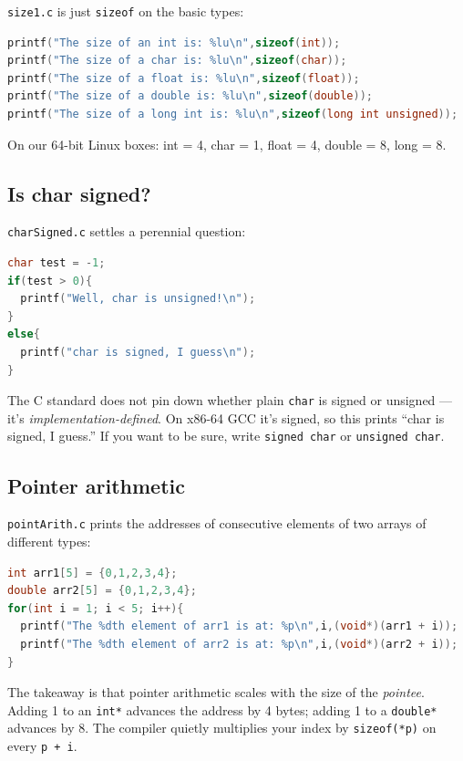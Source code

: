 \documentclass[11pt]{article}
\begin{document}
\texttt{size1.c} is just \texttt{sizeof} on the basic types:

\begin{lstlisting}[language=C]
printf("The size of an int is: %lu\n",sizeof(int));
printf("The size of a char is: %lu\n",sizeof(char));
printf("The size of a float is: %lu\n",sizeof(float));
printf("The size of a double is: %lu\n",sizeof(double));
printf("The size of a long int is: %lu\n",sizeof(long int unsigned));
\end{lstlisting}

On our 64-bit Linux boxes: int = 4, char = 1, float = 4, double = 8,
long = 8.

\subsection*{Is char signed?}

\texttt{charSigned.c} settles a perennial question:

\begin{lstlisting}[language=C]
char test = -1;
if(test > 0){
  printf("Well, char is unsigned!\n");
}
else{
  printf("char is signed, I guess\n");
}
\end{lstlisting}

The C standard does not pin down whether plain \texttt{char} is
signed or unsigned --- it's \emph{implementation-defined}. On x86-64
GCC it's signed, so this prints ``char is signed, I guess.'' If you
want to be sure, write \texttt{signed char} or \texttt{unsigned
char}.

\subsection*{Pointer arithmetic}

\texttt{pointArith.c} prints the addresses of consecutive elements of
two arrays of different types:

\begin{lstlisting}[language=C]
int arr1[5] = {0,1,2,3,4};
double arr2[5] = {0,1,2,3,4};
for(int i = 1; i < 5; i++){
  printf("The %dth element of arr1 is at: %p\n",i,(void*)(arr1 + i));
  printf("The %dth element of arr2 is at: %p\n",i,(void*)(arr2 + i));
}
\end{lstlisting}

The takeaway is that pointer arithmetic scales with the size of the
\emph{pointee}. Adding 1 to an \texttt{int*} advances the address by
4 bytes; adding 1 to a \texttt{double*} advances by 8. The compiler
quietly multiplies your index by \texttt{sizeof(*p)} on every
\texttt{p + i}.
\end{document}
